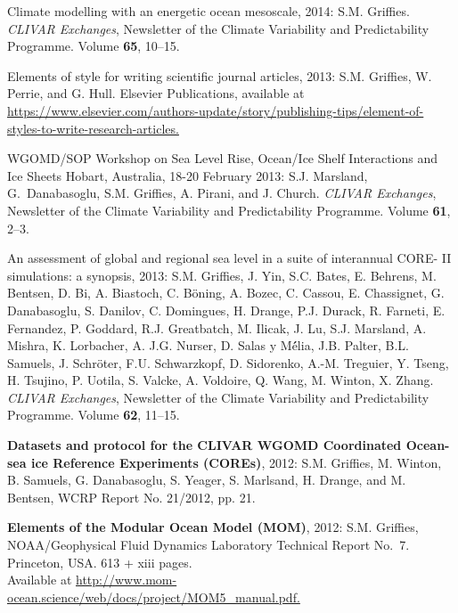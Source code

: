 \begin{etaremune}
\item Climate modelling with an energetic ocean mesoscale, 2014: S.M. Grif\/f\/ies.  {\em CLIVAR Exchanges}, Newsletter of the
  Climate Variability and Predictability Programme.  Volume {\bf 65},
  10--15.

\item Elements of style for writing scientific journal articles, 2013:
  S.M. Grif\/f\/ies, W. Perrie, and G. Hull. Elsevier
  Publications, available at \href{https://www.elsevier.com/authors-update/story/publishing-tips/element-of-styles-to-write-research-articles}{https://www.elsevier.com/authors-update/story/publishing-tips/element-of-styles-to-write-research-articles.}

\item WGOMD/SOP Workshop on Sea Level Rise, Ocean/Ice Shelf
  Interactions and Ice Sheets Hobart, Australia, 18-20 February 2013:
  S.J. Marsland, G.\ Danabasoglu, S.M. Grif\/f\/ies, A. Pirani,
  and J. Church.  {\em CLIVAR Exchanges}, Newsletter of the Climate
  Variability and Predictability Programme.  Volume {\bf 61}, 2--3.

\item An assessment of global and regional sea level in a suite of
  interannual CORE- II simulations: a synopsis, 2013:  S.M. Grif\/f\/ies, J. Yin, S.C. Bates, E. Behrens, M.  Bentsen,
  D. Bi, A. Biastoch, C. B\"{o}ning, A. Bozec, C. Cassou,
  E. Chassignet, G. Danabasoglu, S. Danilov, C. Domingues, H. Drange,
  P.J. Durack, R. Farneti, E. Fernandez, P. Goddard, R.J. Greatbatch,
  M. Ilicak, J. Lu, S.J. Marsland, A. Mishra, K. Lorbacher,
  A. J.G. Nurser, D. Salas y M\'{é}lia, J.B. Palter, B.L. Samuels,
  J. Schr\"{o}ter, F.U. Schwarzkopf, D. Sidorenko, A.-M. Treguier,
  Y. Tseng, H. Tsujino, P.  Uotila, S. Valcke, A. Voldoire, Q. Wang,
  M. Winton, X. Zhang. {\em CLIVAR Exchanges}, Newsletter of the
  Climate Variability and Predictability Programme. Volume {\bf 62},
  11--15.

\item {\bf Datasets and protocol for the CLIVAR WGOMD Coordinated
    Ocean-sea ice Reference Experiments (COREs)}, 2012: S.M. Grif\/f\/ies, M. Winton, B. Samuels, G. Danabasoglu,
  S. Yeager, S. Marlsand, H.  Drange, and M. Bentsen, WCRP Report
  No. 21/2012, pp. 21.

\item {\bf Elements of the Modular Ocean Model (MOM)}, 2012: S.M. Grif\/f\/ies, NOAA/Geophysical Fluid Dynamics Laboratory
  Technical Report No.\ 7. Princeton, USA.  613 + xiii pages. \\
  Available at 
  \href{http://www.mom-ocean.science/web/docs/project/MOM5_manual.pdf}{http://www.mom-ocean.science/web/docs/project/MOM5\_manual.pdf.}


\end{etaremune}
